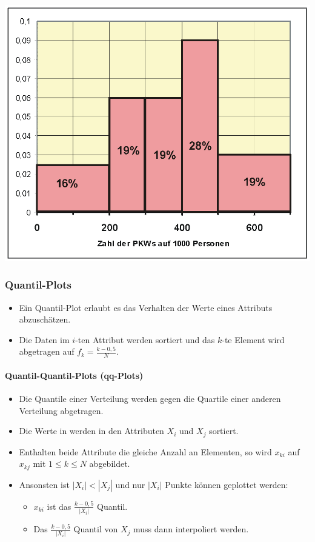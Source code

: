 \documentclass{scrartcl}
\begin{document}
\includegraphics[width=\linewidth]{figures/hist.png}

\subsubsection{Quantil-Plots}

\begin{itemize}
	\item Ein Quantil-Plot erlaubt es das Verhalten der Werte eines Attributs 
	abzuschätzen.
	\item Die Daten im $ i $-ten Attribut werden sortiert und das $ k $-te 
	Element wird abgetragen auf $ f_k = \frac{k-0,5}{N} $.
\end{itemize}

\paragraph{Quantil-Quantil-Plots (qq-Plots)}

\begin{itemize}
	\item Die Quantile einer Verteilung werden gegen die Quartile einer anderen 
	Verteilung abgetragen.
	\item Die Werte in werden in den Attributen $ X_i $ und $ X_j $ sortiert.
	\item Enthalten beide Attribute die gleiche Anzahl an Elementen, so wird $ 
	x_{ki} $ auf $ x_{kj} $ mit $ 1 \leq k \leq N $ abgebildet.
	\item Ansonsten ist $ |X_i| < |X_j| $ und nur $ |X_i| $ Punkte können 
	geplottet werden:
	\begin{itemize}
		\item $ x_{ki} $ ist das $ \frac{k-0,5}{|X_i|} $ Quantil.
		\item Das $ \frac{k-0,5}{|X_i|} $ Quantil von $ X_j $ muss dann 
		interpoliert werden.
	\end{itemize}
\end{itemize}
\end{document}
